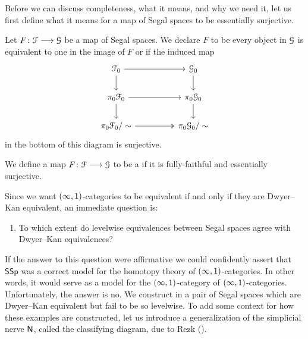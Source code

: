 Before we can discuss completeness, what it means, and why we need it, let us first define what it means for a map of Segal spaces to be essentially surjective.

\begin{definition}
    Let $F \colon \mathcal F \longrightarrow \mathcal G$ be a map of Segal spaces. We declare $F$ to be  every object in $\mathcal G$ is equivalent to one in the image of $F$ or if the induced map 
    \begin{equation}
    \begin{tikzcd}[ampersand replacement=\&]
        {\cF_0} \&\& {\cG_0} \\
        {\pi_0\cF_0} \&\& {\pi_{0}\cG_{0}} \\
        {\pi_{0}\cF_{0}{/\sim}} \&\& {\pi_{0}\cG_{0}/\sim}
        \arrow[from=1-1, to=1-3]
        \arrow[from=1-1, to=2-1]
        \arrow[from=1-3, to=2-3]
        \arrow[from=2-1, to=2-3]
        \arrow[from=2-1, to=3-1]
        \arrow[from=2-3, to=3-3]
        \arrow[two heads, from=3-1, to=3-3]
    \end{tikzcd}
    \end{equation}
    in the bottom of this diagram is surjective.
\end{definition}

\begin{definition}
    We define a map $F\colon \mathcal F \longrightarrow \mathcal G$ to be a  if it is fully-faithful and essentially surjective.
\end{definition}

Since we want $(\operatorname{\infty},1)$-categories to be equivalent if and only if they are Dwyer--Kan equivalent, an immediate question is: 

\begin{enumerate}
    \item[\textbf{Q:}] To which extent do levelwise equivalences between Segal spaces agree with Dwyer--Kan equivalences? 
\end{enumerate}

If the answer to this question were affirmative we could confidently assert that
$\mathsf{SSp}$ was a correct model for the homotopy theory of
$(\operatorname{\infty},1)$-categories. In other words, it would serve as a model for the
$(\operatorname{\infty},1)$-category of $(\operatorname{\infty},1)$-categories. Unfortunately, the answer is no.
We construct in  a pair of Segal spaces which are
Dwyer--Kan equivalent but fail to be so levelwise. To add some context for how
these examples are constructed, let us introduce a generalization of the
simplicial nerve $\mathsf N$, called the classifying diagram, due to Rezk
(\cite{Rezk01}).

